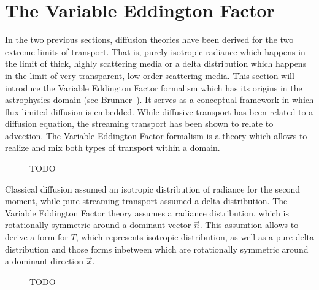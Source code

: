 \section{The Variable Eddington Factor}
\label{sec:fld_vef}

In the two previous sections, diffusion theories have been derived for the two extreme limits of transport. That is, purely isotropic radiance which happens in the limit of thick, highly scattering media or a delta distribution which happens in the limit of very transparent, low order scattering media. This section will introduce the Variable Eddington Factor formalism which has its origins in the astrophysics domain (see Brunner~\cite{Brunner02}). It serves as a conceptual framework in which flux-limited diffusion is embedded. While diffusive transport has been related to a diffusion equation, the streaming transport has been shown to relate to advection. The Variable Eddington Factor formalism is a theory which allows to realize and mix both types of transport within a domain.
\begin{figure}[h]
\centering
{}
\caption{TODO}
\label{fig:fld_vef_advection_diffusion}
\end{figure}

Classical diffusion assumed an isotropic distribution of radiance for the second moment, while pure streaming transport assumed a delta distribution. The Variable Eddington Factor theory assumes a radiance distribution, which is rotationally symmetric around a dominant vector $\vec{n}$. This assumtion allows to derive a form for $T$, which represents isotropic distribution, as well as a pure delta distribution and those forms inbetween which are rotationally symmetric around a dominant direction $\vec{x}$.
\begin{figure}[h]
\centering
{}
\caption{TODO}
\label{fig:fld_vef_advection_diffusion}
\end{figure}

